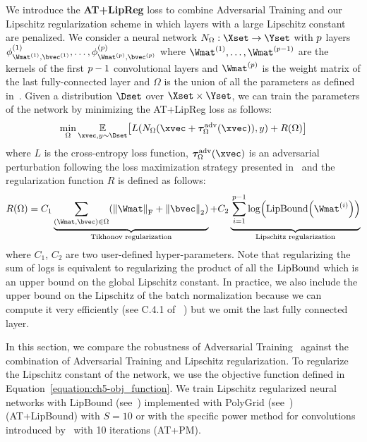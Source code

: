 We introduce the \textbf{AT+LipReg} loss to combine Adversarial Training and our Lipschitz regularization scheme in which layers with a large Lipschitz constant are penalized.
We consider a neural network $N_\Omega : \Xset \rightarrow \Yset$ with $p$ layers $\phi^{(1)}_{\Wmat^{(1)}, \bvec^{(1)}}, \dots, \phi^{(\depth)}_{\Wmat^{(\depth)}, \bvec^{(\depth)}}$ where $\Wmat^{(1)}, \dots, \Wmat^{(\depth-1)}$ are the kernels of the first $p-1$ convolutional layers and $\Wmat^{(\depth)}$ is the weight matrix of the last fully-connected layer and $\Omega$ is the union of all the parameters as defined in~.
Given a distribution $\Dset$ over $\Xset \times \Yset$, we can train the parameters of the network by minimizing the AT+LipReg loss as follows:
\begin{equation} \label{equation:ch5-obj_function}
  \min_{\Omega} \Ebb_{\xvec,y \sim \Dset} \left[ L(N_\Omega(\xvec + \adv^{\text{adv}}_\Omega(\xvec)), y) + R(\Omega) \right]
\end{equation}
where $L$ is the cross-entropy loss function, $\adv^{\text{adv}}_\Omega(\xvec)$ is an adversarial perturbation following the loss maximization strategy presented in~ and the regularization function $R$ is defined as follows:
\begin{equation}
  R(\Omega) =  C_1 \underbrace{\sum_{(\Wmat, \bvec) \in \Omega} \left( \norm{\Wmat}_\fro + \norm{\bvec}_2 \right)}_{
  \text{Tikhonov regularization}} + C_2 \underbrace{\vphantom{\sum_{(\Wmat, \bvec) \in \Omega}} \sum_{i=1}^{\depth-1} \log\left(\lipbound\left(\Wmat^{(i)}\right)\right)}_{\text{Lipschitz regularization}} 
\end{equation}
where $C_1$, $C_2$ are two user-defined hyper-parameters.
Note that regularizing the sum of logs is equivalent to regularizing the product of all the $\mathrm{LipBound}$ which is an upper bound on the global Lipschitz constant.
In practice, we also include the upper bound on the Lipschitz of the batch normalization because we can compute it very efficiently (see C.4.1 of ~\citet{tsuzuku2018lipschitz}) but we omit the last fully connected layer.

In this section, we compare the robustness of Adversarial Training~\cite{goodfellow2014explaining, madry2018towards} against the combination of Adversarial Training and Lipschitz regularization.
To regularize the Lipschitz constant of the network, we use the objective function defined in Equation~\ref{equation:ch5-obj_function}.
We train Lipschitz regularized neural networks with LipBound (see~) implemented with PolyGrid (see~) (AT+LipBound) with $S = 10$ or with the specific power method for convolutions introduced by~\citet{farnia2018generalizable} with 10 iterations (AT+PM).

